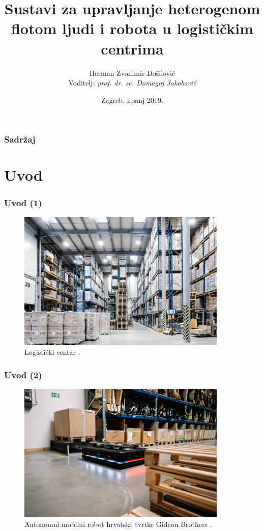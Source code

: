 \documentclass{beamer}
\title[Seminar]{Sustavi za upravljanje heterogenom flotom ljudi i robota u logističkim centrima}
\author[Herman Zvonimir Došilović]{Herman Zvonimir Došilović\\ Voditelj: \textit{prof. dr. sc. Domagoj Jakobović}}
\institute[FER]{Sveučilište u Zagrebu\\ Fakultet elektrotehnike i računarstva}
\date{Zagreb, lipanj 2019.}
\begin{document}

\frame{\titlepage}

\begin{frame}
\frametitle{Sadržaj}
\tableofcontents
\end{frame}

\section{Uvod}
\begin{frame}
\frametitle{Uvod (1)}
\begin{figure}[htb]
    \centering
    \includegraphics[width=10cm]{images/logisticki-centar.jpg}
    \caption{Logistički centar \citep{SmartSimply}.}
\end{figure}
\end{frame}

\begin{frame}
\frametitle{Uvod (2)}
\begin{figure}[htb]
    \centering
    \includegraphics[width=10cm]{images/robot-01.jpg}
    \caption{Autonomni mobilni robot hrvatske tvrtke Gideon Brothers \citep{Gideon:Logisticsrobotlingo}.}
\end{figure}
\end{frame}
\end{document}
